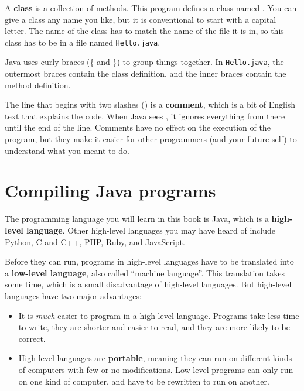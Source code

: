 
A {\bf class} is a collection of methods.
This program defines a class named .
You can give a class any name you like, but it is conventional to start with a capital letter.
The name of the class has to match the name of the file it is in, so this class has to be in a file named {\tt Hello.java}.


Java uses curly braces (\{ and \}) to group things together.
In {\tt Hello.java}, the outermost braces contain the class definition, and the inner braces contain the method definition.


The line that begins with two slashes (\java{//}) is a {\bf comment}, which is a bit of English text that explains the code.
When Java sees \java{//}, it ignores everything from there until the end of the line.
Comments have no effect on the execution of the program, but they make it easier for other programmers (and your future self) to understand what you meant to do.


\section{Compiling Java programs}


The programming language you will learn in this book is Java, which is a {\bf high-level language}.
Other high-level languages you may have heard of include Python, C and C++, PHP, Ruby, and JavaScript.


Before they can run, programs in high-level languages have to be translated into a {\bf low-level language}, also called ``machine language''.
This translation takes some time, which is a small disadvantage of high-level languages.
But high-level languages have two major advantages:

\begin{itemize}

\item It is {\em much} easier to program in a high-level language.
Programs take less time to write, they are shorter and easier to read, and they are more likely to be correct.


\item High-level languages are {\bf portable}, meaning they can run on different kinds of computers with few or no modifications.
Low-level programs can only run on one kind of computer, and have to be rewritten to run on another.

\end{itemize}


